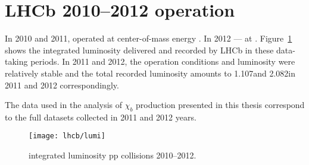 

\section{LHCb 2010--2012 operation}

In 2010 and 2011, \lhcb operated at center-of-mass energy \tev. In 2012
--- at \tev. Figure~\ref{fig:lumi} shows the integrated luminosity
delivered and recorded by LHCb in these data-taking periods. In 2011 and 2012,
the operation conditions and luminosity were relatively stable and the total
recorded luminosity amounts to 1.107\invfb and 2.082\invfb in 2011 and 2012
correspondingly.

The data used in the analysis of $\chi_b$ production presented in this thesis
correspond to the full datasets collected in 2011 and 2012 years.

\begin{figure}[tb]
\begin{center}
\texttt{[image: lhcb/lumi]}
\end{center}
\caption{\small \lhcb integrated luminosity pp collisions 2010--2012.}
\label{fig:lumi}
\end{figure}